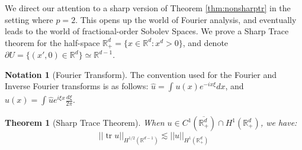 \documentclass[letterpaper,10pt]{article}
\newcommand{\lsim}{\lesssim}
\DeclareMathOperator{\tr}{tr}
\theoremstyle{definition}
\newtheorem*{ntt}{Notation}
\theoremstyle{remark}
\theoremstyle{plain}
\newtheorem{thm}{Theorem}[section]
\begin{document}
We direct our attention to a sharp version of Theorem \ref{thm:nonsharptr} in
the setting where $p=2$.
This opens up the world of Fourier analysis, and eventually leads to the world
of fractional-order Sobolev Spaces.
We prove a Sharp Trace theorem for the half-space $\mathbb R^d_+=\{x\in\mathbb R^d:x^d>0\}$,
and denote $\partial U=\{(x',0)\in\mathbb R^d\}\simeq\mathbb R^{d-1}$.

\begin{ntt}[Fourier Transform]
    The convention used for the Fourier and Inverse Fourier transforms
    is as follows: $\hat u=\int_{}^{}u(x)e^{-ix\xi}dx$, and $u(x)=\int_{}^{}\hat ue^{i\xi x}\frac{d\xi}{2\pi}$.
\end{ntt}
\begin{thm}[Sharp Trace Theorem]\label{thm:sharptr}
    When $u\in C^1(\overline{\mathbb R^d_+})\cap H^1(\mathbb R^d_+)$, we have:
    $$
        ||\tr u||_{H^{1/2}(\mathbb R^{d-1})}\lsim ||u||_{H^1(\mathbb R^d_+)}
    $$
\end{thm}
\end{document}
